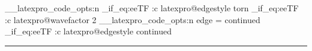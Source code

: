 \documentclass{article}
\begin{document}
\ExplSyntaxOn
\__latexpro_code_opts:n { }
  { \str_if_eq:eeTF { \use:c { latexpro@edgestyle } } { torn } { \iftrue } { \iffalse } }
  { \str_if_eq:eeTF { \use:c { latexpro@wavefactor } } { 2 } { \iftrue } { \iffalse } }
\__latexpro_code_opts:n { edge = continued }
  { \str_if_eq:eeTF { \use:c { latexpro@edgestyle } } { continued } { \iftrue } { \iffalse } }
\ExplSyntaxOff
\noindent\rule{1pt}{\dimexpr{}\baselineskip}\par
{}
\end{document}
